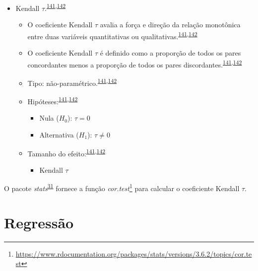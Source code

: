 \documentclass[
  a4paper,
]{book}
\providecommand{\tightlist}{%
  \setlength{\itemsep}{0pt}\setlength{\parskip}{0pt}}
\renewcommand{\href}[2]{#2\footnote{\url{#1}}}
\newenvironment{infobox}[1]
  {
  \begin{itemize}
  \renewcommand{\labelitemi}{
    \raisebox{-.7\height}[0pt][0pt]{
      {\setkeys{Gin}{width=3em,keepaspectratio}
        \texttt{[image: \#1]}}
    }
  }
  \setlength{\fboxsep}{1em}
  \begin{blackbox}
  \item
  }
  {
  \end{blackbox}
  \end{itemize}
  }
\begin{document}
\begin{itemize}
\item
  Kendall \(\tau\).\textsuperscript{\protect\hyperlink{ref-khamis2008}{141},\protect\hyperlink{ref-allison2022}{142}}

  \begin{itemize}
  \item
    O coeficiente Kendall \(\tau\) avalia a força e direção da relação monotônica entre duas variáveis quantitativas ou qualitativas.\textsuperscript{\protect\hyperlink{ref-khamis2008}{141},\protect\hyperlink{ref-allison2022}{142}}
  \item
    O coeficiente Kendall \(\tau\) é definido como a proporção de todos os pares concordantes menos a proporção de todos os pares discordantes.\textsuperscript{\protect\hyperlink{ref-khamis2008}{141},\protect\hyperlink{ref-allison2022}{142}}
  \item
    Tipo: não-paramétrico.\textsuperscript{\protect\hyperlink{ref-khamis2008}{141},\protect\hyperlink{ref-allison2022}{142}}
  \item
    Hipóteses:\textsuperscript{\protect\hyperlink{ref-khamis2008}{141},\protect\hyperlink{ref-allison2022}{142}}

    \begin{itemize}
    \item
      Nula (\(H_{0}\)): \(\tau=0\)
    \item
      Alternativa (\(H_{1}\)): \(\tau≠0\)
    \end{itemize}
  \item
    Tamanho do efeito:\textsuperscript{\protect\hyperlink{ref-khamis2008}{141},\protect\hyperlink{ref-allison2022}{142}}

    \begin{itemize}
    \tightlist
    \item
      Kendall \(\tau\)
    \end{itemize}
  \end{itemize}
\end{itemize}

\begin{infobox}{images/Rlogo}
O pacote \emph{stats}\textsuperscript{\protect\hyperlink{ref-stats-2}{31}} fornece a função \href{https://www.rdocumentation.org/packages/stats/versions/3.6.2/topics/cor.test}{\emph{cor.test}} para calcular o coeficiente Kendall \(\tau\).

\end{infobox}

\hypertarget{analise-inferencial-regressao}{%
\chapter{\texorpdfstring{\textbf{Regressão}}{Regressão}}\label{analise-inferencial-regressao}}
\end{document}
